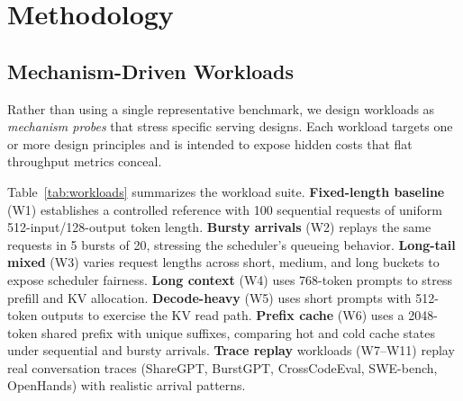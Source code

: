 \documentclass[conference]{IEEEtran}
\begin{document}
\section{Methodology}
\label{sec:methodology}

\subsection{Mechanism-Driven Workloads}

Rather than using a single representative benchmark, we design workloads as
\emph{mechanism probes} that stress specific serving designs. Each workload
targets one or more design principles and is intended to expose hidden costs
that flat throughput metrics conceal.

Table~\ref{tab:workloads} summarizes the workload suite. \textbf{Fixed-length
baseline} (W1) establishes a controlled reference with 100 sequential requests
of uniform 512-input/128-output token length. \textbf{Bursty arrivals} (W2)
replays the same requests in 5 bursts of 20, stressing the scheduler's
queueing behavior. \textbf{Long-tail mixed} (W3) varies request lengths across
short, medium, and long buckets to expose scheduler fairness. \textbf{Long
context} (W4) uses 768-token prompts to stress prefill and KV allocation.
\textbf{Decode-heavy} (W5) uses short prompts with 512-token outputs to
exercise the KV read path. \textbf{Prefix cache} (W6) uses a 2048-token
shared prefix with unique suffixes, comparing hot and cold cache states under
sequential and bursty arrivals. \textbf{Trace replay} workloads (W7--W11)
replay real conversation traces (ShareGPT, BurstGPT, CrossCodeEval,
SWE-bench, OpenHands) with realistic arrival patterns.
\end{document}
